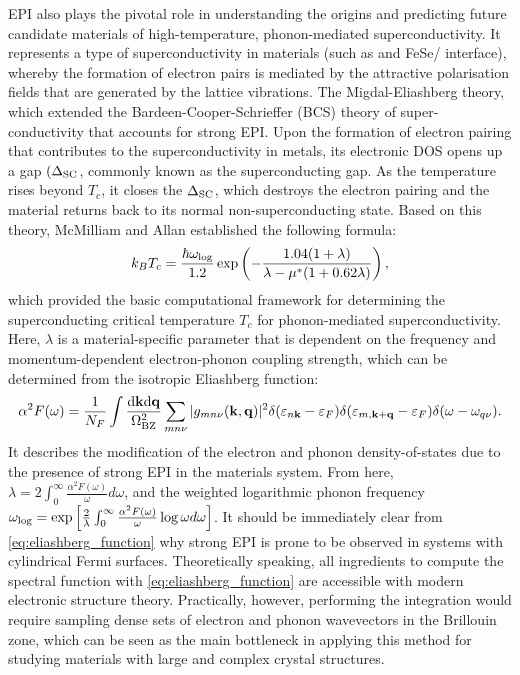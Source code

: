 EPI also plays the pivotal role in understanding the origins and predicting future candidate materials of high-temperature,  phonon-mediated superconductivity. It represents a type of superconductivity in materials (such as \cite{joas2002theory} and FeSe/ interface\cite{yang2024phonon}), whereby the formation of electron pairs is mediated by the attractive polarisation fields that are generated by the lattice vibrations. The Migdal-Eliashberg theory,\cite{Migdal1958,Eliashberg1960} which extended the Bardeen-Cooper-Schrieffer (BCS) theory of super-conductivity\cite{Bardeen1957a,Bardeen1957b} that accounts for strong EPI. Upon the formation of electron pairing that contributes to the superconductivity in metals, its electronic DOS opens up a gap $(\Delta_{\mbox{\scriptsize{SC}}}$, commonly known as the superconducting gap. As the temperature rises beyond $T_c$, it closes the $\Delta_{\mbox{\scriptsize{SC}}}$, which destroys the electron pairing and the material returns back to its normal non-superconducting state. Based on this theory, McMilliam and Allan\cite{mcmillan1968transition,allen1975transition} established the following formula:
\begin{equation}
    \label{eq:mcmillan_Tc}
    k_B T_c=\frac{\hbar\omega_{\mbox{\scriptsize{log}}}}{1.2}\exp\left(-\frac{1.04(1+\lambda)}{\lambda-\mu^* (1+0.62\lambda)}\right),
\end{equation}
which provided the basic computational framework for determining the superconducting critical temperature $T_c$ for phonon-mediated superconductivity. Here, $\lambda$ is a material-specific parameter that is dependent on the frequency and momentum-dependent electron-phonon coupling strength, which can be determined from the isotropic Eliashberg function:\cite{allen1972neutron}
\begin{equation}
    \label{eq:eliashberg_function}
    \alpha^2 F(\omega)=\frac{1}{N_F}\int\frac{\mbox{d}\mathbf{k}\mbox{d}\mathbf{q}}{\Omega_{\mbox{\scriptsize{BZ}}}^2}\sum_{mn\nu}|g_{mn\nu}(\mathbf{k},\mathbf{q})|^2\delta(\varepsilon_{n\mathbf{k}}-\varepsilon_F)\delta(\varepsilon_{m,\mathbf{k}+\mathbf{q}}-\varepsilon_F)\delta(\omega-\omega_{q\nu}).
\end{equation}
It describes the modification of the electron and phonon density-of-states due to the presence of strong EPI in the materials system. From here, $\lambda=2\int_0^\infty\frac{\alpha^2 F(\omega)}{\omega}d\omega$, and the weighted logarithmic phonon frequency $\omega_{\mbox{\scriptsize{log}}}=\exp\left[\frac{2}{\lambda} \int_0^\infty\frac{\alpha^2 F(\omega)}{\omega}\log\omega d\omega\right]$. It should be immediately clear from \cref{eq:eliashberg_function} why strong EPI is prone to be observed in systems with cylindrical Fermi surfaces. Theoretically speaking, all ingredients to compute the spectral function with \cref{eq:eliashberg_function} are accessible with modern electronic structure theory. Practically, however, performing the integration would require sampling dense sets of electron and phonon wavevectors in the Brillouin zone, which can be seen as the main bottleneck in applying this method for studying materials with large and complex crystal structures.

